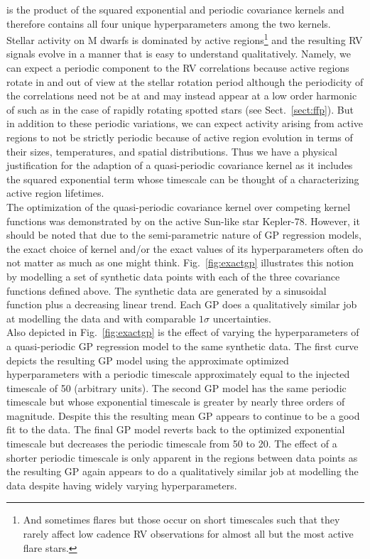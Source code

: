 \noindent is the product of the squared exponential and periodic covariance kernels and therefore
contains all four unique hyperparameters among the two kernels. \\

Stellar activity on M dwarfs
is dominated by active regions\citep{lindegren03}\footnote{And sometimes flares but those
  occur on short timescales such that they rarely affect low cadence RV observations for almost
  all but the most active flare stars.} and the resulting RV signals evolve in a manner that
is easy to understand qualitatively. Namely, we can expect a periodic component to the
RV correlations because active regions rotate in and out of view at the stellar rotation period
although the periodicity of the correlations need not be at \prot{} and may instead appear
at a low order harmonic of \prot{} such as in the case of rapidly rotating spotted stars 
(see Sect.~\ref{sect:ffp}). But in addition to these periodic variations, we can expect activity
arising from active regions to not be strictly periodic because of active region evolution
in terms of their sizes, temperatures, and spatial distributions. Thus we
have a physical justification for the adaption of a
quasi-periodic covariance kernel as it includes the squared exponential term
whose timescale can be thought of a characterizing active region lifetimes. \\

The optimization of the quasi-periodic covariance kernel over competing kernel functions
was demonstrated by \cite{grunblatt15} on the active Sun-like star Kepler-78. However, it
should be noted that due to the semi-parametric nature of GP regression models, the exact
choice of kernel and/or the exact values of its hyperparameters often do not matter as
much as one might think. Fig.~\ref{fig:exactgp} illustrates this notion by modelling a
set of synthetic data points with each of the three covariance functions defined above.
The synthetic data are generated by a sinusoidal function plus a decreasing linear trend. 
Each GP does a qualitatively similar job at modelling the data and with comparable $1\sigma$
uncertainties. \\

Also depicted in Fig.~\ref{fig:exactgp} is the effect of varying the hyperparameters of
a quasi-periodic GP regression model to the same synthetic data. The first curve depicts
the resulting GP model using the approximate optimized hyperparameters with a periodic
timescale approximately equal to the injected timescale of 50 (arbitrary units). The second
GP model has the same periodic timescale but whose exponential timescale is greater by nearly
three orders of magnitude. Despite this the resulting mean GP appears to continue to be a good
fit to the data. The final GP model reverts back to the optimized exponential timescale but
decreases the periodic timescale from 50 to 20. The effect of a shorter periodic timescale
is only apparent in the regions between data points as the resulting GP again appears to do
a qualitatively similar job at modelling the data despite having widely varying hyperparameters.



